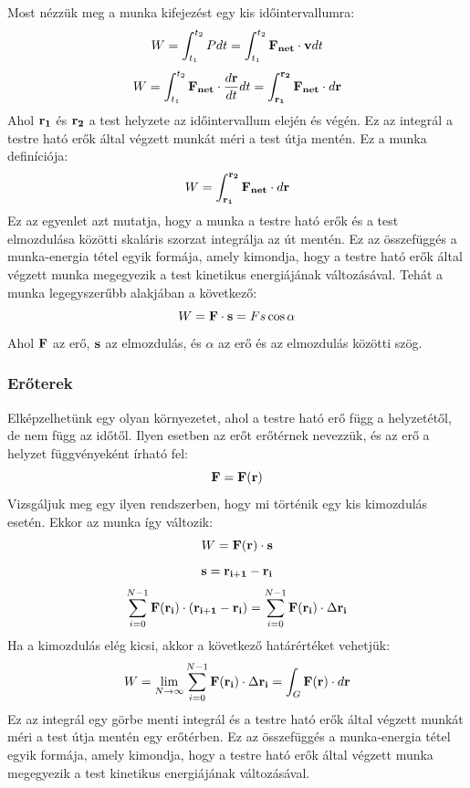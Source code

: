 \documentclass[../main.tex]{subfiles}
\begin{document}
Most nézzük meg a munka kifejezést egy kis időintervallumra:
\begin{equation}
    W = \int_{t_1}^{t_2} P dt = \int_{t_1}^{t_2} \bold{F_{net}} \cdot \bold{v} dt
\end{equation}
\begin{equation}
    W = \int_{t_1}^{t_2} \bold{F_{net}} \cdot \frac{d\bold{r}}{dt} dt = \int_{\bold{r_1}}^{\bold{r_2}} \bold{F_{net}} \cdot d\bold{r}
\end{equation}
Ahol $\bold{r_1}$ és $\bold{r_2}$ a test helyzete az időintervallum elején és végén. Ez az integrál a testre ható erők által végzett munkát méri a test útja mentén. Ez a munka definíciója:
\begin{equation}
    W = \int_{\bold{r_1}}^{\bold{r_2}} \bold{F_{net}} \cdot d\bold{r}
\end{equation}
Ez az egyenlet azt mutatja, hogy a munka a testre ható erők és a test elmozdulása közötti skaláris szorzat integrálja az út mentén. Ez az összefüggés a munka-energia tétel egyik formája,
amely kimondja, hogy a testre ható erők által végzett munka megegyezik a test kinetikus energiájának változásával. Tehát a munka legegyszerűbb alakjában a következő:
\begin{equation}
    W = \bold{F} \cdot \bold{s} = F s \cos \alpha
\end{equation}
Ahol $\bold{F}$ az erő, $\bold{s}$ az elmozdulás, és $\alpha$ az erő és az elmozdulás közötti szög.
\subsubsection{Erőterek}
Elképzelhetünk egy olyan környezetet, ahol a testre ható erő függ a helyzetétől, de nem függ az időtől. Ilyen esetben az erőt erőtérnek nevezzük, és az erő a helyzet függvényeként írható fel:
\begin{equation}
    \bold{F} = \bold{F}(\bold{r})
\end{equation}
Vizsgáljuk meg egy ilyen rendszerben, hogy mi történik egy kis kimozdulás esetén. Ekkor az munka így változik:
\begin{equation}
    W = \bold{F}(\bold{r}) \cdot \bold{s}
\end{equation}
\begin{equation}
    \bold{s} = \bold{r_{i+1}} - \bold{r_i}
\end{equation}
\begin{equation}
    \sum_{i=0}^{N-1} \bold{F}(\bold{r_i}) \cdot (\bold{r_{i+1}} - \bold{r_i}) = \sum_{i=0}^{N-1} \bold{F}(\bold{r_i}) \cdot \Delta \bold{r_i}
\end{equation}
Ha a kimozdulás elég kicsi, akkor a következő határértéket vehetjük:
\begin{equation}
    W = \lim_{N \to \infty} \sum_{i=0}^{N-1} \bold{F}(\bold{r_i}) \cdot \Delta \bold{r_i} = \int_{G}^{} \bold{F}(\bold{r}) \cdot d\bold{r}
\end{equation}
Ez az integrál egy görbe menti integrál és a testre ható erők által végzett munkát méri a test útja mentén egy erőtérben. Ez az összefüggés a munka-energia tétel egyik formája, amely kimondja, hogy a testre ható erők által végzett munka megegyezik a test kinetikus energiájának
változásával.
\end{document}
